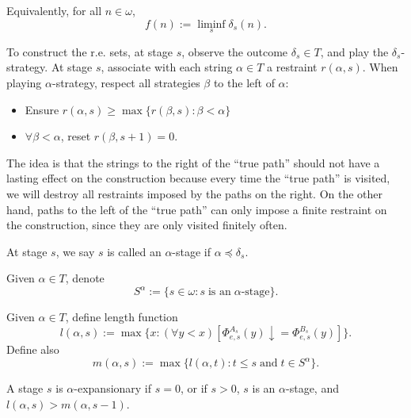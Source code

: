   Equivalently, for all $n\in\omega$,
  \[f(n) :=\liminf_s \delta_s(n).\]

  To construct the r.e. sets, at stage $s$, observe the outcome
  $\delta_s\in T$, and play the $\delta_s$-strategy. At stage $s$,
  associate with each string $\alpha\in T$ a restraint $r(\alpha,s)$.
  When playing $\alpha$-strategy, respect all strategies $\beta$ to the
  left of $\alpha$:
  \begin{itemize}
    \item Ensure $r(\alpha,s) \geq \max\{r(\beta,s): \beta<\alpha\}$
    \item $\forall\beta<\alpha$, reset $r(\beta,s+1)=0$.
  \end{itemize}

  The idea is that the strings to the right of the ``true path'' should not
  have a lasting effect on the construction because every time the ``true
  path'' is visited, we will destroy all restraints imposed by the paths on
  the right. On the other hand, paths to the left of the ``true path'' can
  only impose a finite restraint on the construction, since they are only
  visited finitely often. \\

  \begin{definition}
    At stage $s$, we say $s$ is called an $\alpha$-stage if
    $\alpha\preceq\delta_s$.
  \end{definition}

  \begin{definition}
    Given $\alpha\in T$, denote
    \[S^\alpha := \{s\in\omega: s\; \text{is an}\; \alpha\text{-stage}\}.\]
  \end{definition}

  \begin{definition}
    Given $\alpha\in T$, define length function
    \[l(\alpha,s) := \max\{x: (\forall y<x) [\Phi_{e,s}^{A_s}(y)
      \downarrow =\Phi_{e,s}^{B_s}(y)]\}.\]
    Define also
    \[m(\alpha,s) := \max\{l(\alpha,t): t\leq s\; \text{and}\; t\in
    S^{\alpha}\}.\]
  \end{definition}

  \begin{definition}
    A stage $s$ is $\alpha$-expansionary if $s=0$, or if $s>0$, $s$ is an
    $\alpha$-stage, and $l(\alpha,s)>m(\alpha,s-1)$.
  \end{definition}


